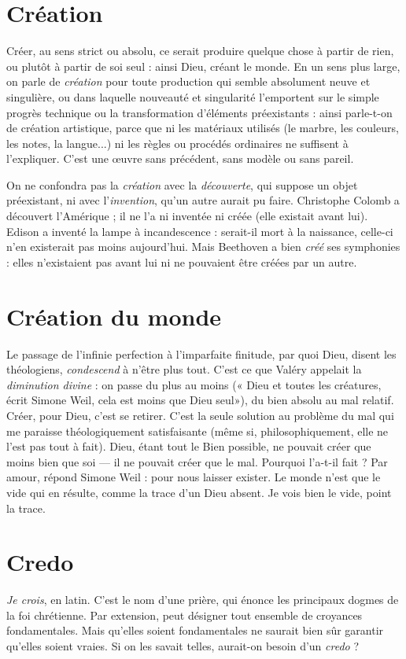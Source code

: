 \section{Création}
Créer, au sens strict ou absolu, ce serait produire quelque chose
à partir de rien, ou plutôt à partir de soi seul : ainsi Dieu,
créant le monde. En un sens plus large, on parle de {\it création} pour toute production
qui semble absolument neuve et singulière, ou dans laquelle nouveauté et
singularité l’emportent sur le simple progrès technique ou la transformation
d'éléments préexistants : ainsi parle-t-on de création artistique, parce que ni les
matériaux utilisés (le marbre, les couleurs, les notes, la langue...) ni les règles
ou procédés ordinaires ne suffisent à l’expliquer. C’est une œuvre sans précédent,
sans modèle ou sans pareil.

On ne confondra pas la {\it création} avec la {\it découverte}, qui suppose un objet
préexistant, ni avec l'{\it invention}, qu’un autre aurait pu faire. Christophe Colomb a
découvert l'Amérique ; il ne l’a ni inventée ni créée (elle existait avant lui). Edison
a inventé la lampe à incandescence : serait-il mort à la naissance, celle-ci n’en existerait
pas moins aujourd’hui. Mais Beethoven a bien {\it créé} ses symphonies : elles
n’existaient pas avant lui ni ne pouvaient être créées par un autre.

\section{Création du monde}
Le passage de l’infinie perfection à l’imparfaite
finitude, par quoi Dieu, disent les théologiens,
{\it condescend} à n'être plus tout. C’est ce que Valéry appelait la {\it diminution divine} :
on passe du plus au moins (« Dieu et toutes les créatures, écrit Simone Weil,
cela est moins que Dieu seul»), du bien absolu au mal relatif. Créer, pour
Dieu, c’est se retirer. C’est la seule solution au problème du mal qui me
paraisse théologiquement satisfaisante (même si, philosophiquement, elle ne
l’est pas tout à fait). Dieu, étant tout le Bien possible, ne pouvait créer que
moins bien que soi — il ne pouvait créer que le mal. Pourquoi l’a-t-il fait ? Par
amour, répond Simone Weil : pour nous laisser exister. Le monde n’est que le
vide qui en résulte, comme la trace d’un Dieu absent.
Je vois bien le vide, point la trace.

\section{Credo}
{\it Je crois}, en latin. C’est le nom d’une prière, qui énonce les principaux
dogmes de la foi chrétienne. Par extension, peut désigner tout
ensemble de croyances fondamentales. Mais qu’elles soient fondamentales ne
saurait bien sûr garantir qu’elles soient vraies. Si on les savait telles, aurait-on
besoin d’un {\it credo} ?

